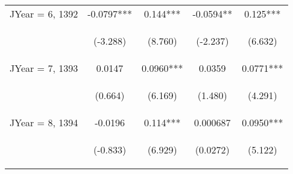 \documentclass[]{article}
\begin{document}
\begin{center}
\begin{tabular}{lcccc}
        JYear = 6, 1392  & -0.0797***                                      & 0.144***                                       & -0.0594**                                      & 0.125***                                       \\
        \vspace{4pt}     & \begin{footnotesize}(-3.288)\end{footnotesize}  & \begin{footnotesize}(8.760)\end{footnotesize}  & \begin{footnotesize}(-2.237)\end{footnotesize} & \begin{footnotesize}(6.632)\end{footnotesize}  \\
        JYear = 7, 1393  & 0.0147                                          & 0.0960***                                      & 0.0359                                         & 0.0771***                                      \\
        \vspace{4pt}     & \begin{footnotesize}(0.664)\end{footnotesize}   & \begin{footnotesize}(6.169)\end{footnotesize}  & \begin{footnotesize}(1.480)\end{footnotesize}  & \begin{footnotesize}(4.291)\end{footnotesize}  \\
        JYear = 8, 1394  & -0.0196                                         & 0.114***                                       & 0.000687                                       & 0.0950***                                      \\
        \vspace{4pt}     & \begin{footnotesize}(-0.833)\end{footnotesize}  & \begin{footnotesize}(6.929)\end{footnotesize}  & \begin{footnotesize}(0.0272)\end{footnotesize} & \begin{footnotesize}(5.122)\end{footnotesize}  \\

\end{tabular}
\end{center}
\end{document}
